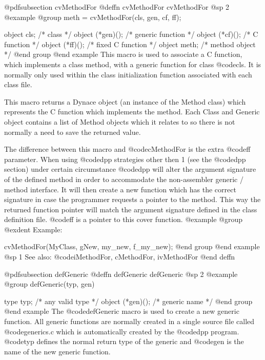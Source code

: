{{{{@pdfsubsection {cvMethodFor}
@deffn {cvMethodFor} cvMethodFor
@sp 2
@example
@group
meth = cvMethodFor(cls, gen, cf, ff);

object  cls;            /*  class               */
object  (*gen)();       /*  generic function    */
object  (*cf)();        /*  C function          */
object  (*ff)();        /*  fixed C function    */
object  meth;           /*  method object       */
@end group
@end example
This macro is used to associate a C function, which implements a
class method, with a generic function for class @code{cls}.  It is
normally only used within the class initialization function associated
with each class file.

This macro returns a Dynace object (an instance of the Method class) which
represents the C function which implements the method.  Each Class 
and Generic object contains a list of Method objects which it relates
to so there is not normally a need to save the returned value.

The difference between this macro and @code{cMethodFor} is the extra @code{ff}
parameter.  When using @code{dpp} strategies other then 1 (see the @code{dpp}
section) under certain circumstance @code{dpp} will alter the argument
signature of the defined method in order to accommodate the non-assembler
generic / method interface.  It will then create a new function which has
the correct signature in case the programmer requests a pointer to the
method.  This way the returned function pointer will match the argument
signature defined in the class definition file.  @code{ff} is a pointer
to this cover function.
@example
@group
@exdent Example:

cvMethodFor(MyClass, gNew, my_new, f_my_new);
@end group
@end example
@sp 1
See also:  @code{iMethodFor, cMethodFor, ivMethodFor}
@end deffn

















@pdfsubsection {defGeneric}
@deffn {defGeneric} defGeneric
@sp 2
@example
@group
defGeneric(typ, gen)

type    typ;       /*  any valid type  */
object  (*gen)();  /*  generic name    */
@end group
@end example
The @code{defGeneric} macro is used to create a new generic function.
All generic functions are normally created in a single source file
called @code{generics.c} which is automatically created by the
@code{dpp} program.  @code{typ} defines the normal return type
of the generic and @code{gen} is the name of the new generic function.

}}}}
